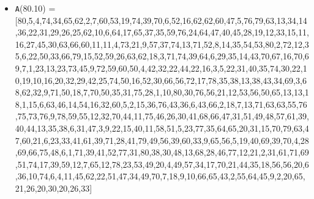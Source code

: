 \documentclass[runningheads,a4paper]{llncs}
\begin{document}
\begin{itemize}
	\item {\texttt A(80.10) = } [80,5,4,74,34,65,62,2,7,60,53,19,74,39,70,6,52,16,62,62,60,47,5,76,79,63,13,34,14,36,22,31,29,26,25,62,10,6,64,17,65,37,35,59,76,24,64,47,40,45,28,19,12,33,15,11,16,27,45,30,63,66,60,11,11,4,73,21,9,57,37,74,13,71,52,8,14,35,54,53,80,2,72,12,35,6,22,50,33,66,79,15,52,59,26,63,62,18,3,71,74,39,64,6,29,35,14,43,70,67,16,70,69,7,1,23,13,23,73,45,9,72,59,60,50,4,42,32,22,44,22,16,3,5,22,31,40,35,74,30,22,10,19,10,16,20,32,29,42,25,74,50,16,52,30,66,56,72,17,78,35,38,13,38,43,34,69,3,68,62,32,9,71,50,18,7,70,50,35,31,75,28,1,10,80,30,76,56,21,12,53,56,50,65,13,13,18,1,15,6,63,46,14,54,16,32,60,5,2,15,36,76,43,36,6,43,66,2,18,7,13,71,63,63,55,76,75,73,76,9,78,59,55,12,32,70,44,11,75,46,26,30,41,68,66,47,31,51,49,48,57,61,39,40,44,13,35,38,6,31,47,3,9,22,15,40,11,58,51,5,23,77,35,64,65,20,31,15,70,79,63,47,60,21,6,23,33,41,61,39,71,28,41,79,49,56,39,60,33,9,65,56,5,19,40,69,39,70,4,28,69,66,75,48,6,1,71,39,41,52,77,31,80,38,30,48,13,68,28,46,77,12,21,2,31,61,71,69,51,74,17,39,59,12,7,65,12,78,23,53,49,20,4,49,57,34,17,70,21,44,35,18,56,56,20,6,36,10,74,6,4,11,45,62,22,51,47,34,49,70,7,18,9,10,66,65,43,2,55,64,45,9,2,20,65,21,26,20,30,20,26,33]
\end{itemize}


\begin{thebibliography}{4}


\end{thebibliography}
\end{document}
